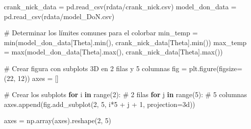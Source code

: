 \documentclass[
  spanish,
  us-letterpaper,
]{scrreprt}
\newenvironment{Shaded}{\begin{snugshade}}{\end{snugshade}}
\newcommand{\BuiltInTok}[1]{\textcolor[rgb]{0.00,0.23,0.31}{#1}}
\newcommand{\CommentTok}[1]{\textcolor[rgb]{0.37,0.37,0.37}{#1}}
\newcommand{\ControlFlowTok}[1]{\textcolor[rgb]{0.00,0.23,0.31}{\textbf{#1}}}
\newcommand{\DecValTok}[1]{\textcolor[rgb]{0.68,0.00,0.00}{#1}}
\newcommand{\KeywordTok}[1]{\textcolor[rgb]{0.00,0.23,0.31}{\textbf{#1}}}
\newcommand{\NormalTok}[1]{\textcolor[rgb]{0.00,0.23,0.31}{#1}}
\newcommand{\OperatorTok}[1]{\textcolor[rgb]{0.37,0.37,0.37}{#1}}
\newcommand{\StringTok}[1]{\textcolor[rgb]{0.13,0.47,0.30}{#1}}
\newcommand{\VerbatimStringTok}[1]{\textcolor[rgb]{0.13,0.47,0.30}{#1}}
\theoremstyle{plain}
\theoremstyle{definition}
\theoremstyle{remark}
\begin{document}
\begin{Shaded}
\begin{Highlighting}[]
\NormalTok{crank\_nick\_data }\OperatorTok{=}\NormalTok{ pd.read\_csv(}\VerbatimStringTok{r\textquotesingle{}data/crank\_nick}\DecValTok{.}\VerbatimStringTok{csv\textquotesingle{}}\NormalTok{)}
\NormalTok{model\_don\_data }\OperatorTok{=}\NormalTok{ pd.read\_csv(}\VerbatimStringTok{r\textquotesingle{}data/model\_DoN}\DecValTok{.}\VerbatimStringTok{csv\textquotesingle{}}\NormalTok{)}

\CommentTok{\# Determinar los límites comunes para el colorbar}
\NormalTok{min\_temp }\OperatorTok{=} \BuiltInTok{min}\NormalTok{(model\_don\_data[}\StringTok{\textquotesingle{}Theta\textquotesingle{}}\NormalTok{].}\BuiltInTok{min}\NormalTok{(),}
\NormalTok{                crank\_nick\_data[}\StringTok{\textquotesingle{}Theta\textquotesingle{}}\NormalTok{].}\BuiltInTok{min}\NormalTok{())}
\NormalTok{max\_temp }\OperatorTok{=} \BuiltInTok{max}\NormalTok{(model\_don\_data[}\StringTok{\textquotesingle{}Theta\textquotesingle{}}\NormalTok{].}\BuiltInTok{max}\NormalTok{(), }
\NormalTok{                crank\_nick\_data[}\StringTok{\textquotesingle{}Theta\textquotesingle{}}\NormalTok{].}\BuiltInTok{max}\NormalTok{())}

\CommentTok{\# Crear figura con subplots 3D en 2 filas y 5 columnas}
\NormalTok{fig }\OperatorTok{=}\NormalTok{ plt.figure(figsize}\OperatorTok{=}\NormalTok{(}\DecValTok{22}\NormalTok{, }\DecValTok{12}\NormalTok{))}
\NormalTok{axes }\OperatorTok{=}\NormalTok{ []}

\CommentTok{\# Crear los subplots}
\ControlFlowTok{for}\NormalTok{ i }\KeywordTok{in} \BuiltInTok{range}\NormalTok{(}\DecValTok{2}\NormalTok{):  }\CommentTok{\# 2 filas}
    \ControlFlowTok{for}\NormalTok{ j }\KeywordTok{in} \BuiltInTok{range}\NormalTok{(}\DecValTok{5}\NormalTok{):  }\CommentTok{\# 5 columnas}
\NormalTok{        axes.append(fig.add\_subplot(}\DecValTok{2}\NormalTok{, }\DecValTok{5}\NormalTok{, i}\OperatorTok{*}\DecValTok{5} \OperatorTok{+}\NormalTok{ j }\OperatorTok{+} \DecValTok{1}\NormalTok{, projection}\OperatorTok{=}\StringTok{\textquotesingle{}3d\textquotesingle{}}\NormalTok{))}

\NormalTok{axes }\OperatorTok{=}\NormalTok{ np.array(axes).reshape(}\DecValTok{2}\NormalTok{, }\DecValTok{5}\NormalTok{)}


\end{Highlighting}
\end{Shaded}
\end{document}
